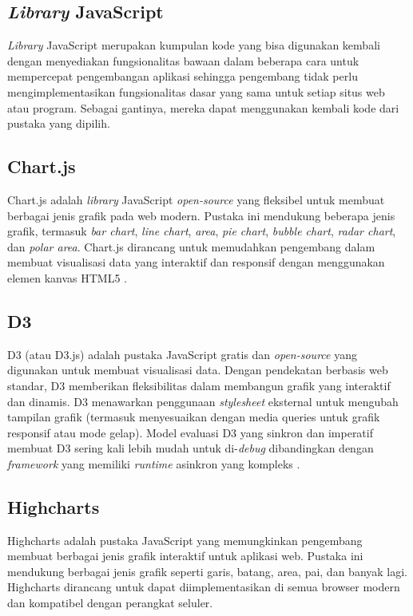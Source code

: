\subsection{\textit{Library} JavaScript}
\textit{Library} JavaScript merupakan kumpulan kode yang bisa digunakan kembali dengan menyediakan fungsionalitas bawaan dalam beberapa cara untuk mempercepat pengembangan aplikasi sehingga pengembang tidak perlu mengimplementasikan fungsionalitas dasar yang sama untuk setiap situs web atau program. Sebagai gantinya, mereka dapat menggunakan kembali kode dari pustaka yang dipilih.

\subsection{Chart.js}
Chart.js adalah \textit{library} JavaScript \textit{open-source} yang fleksibel untuk membuat berbagai jenis grafik pada web modern. Pustaka ini mendukung beberapa jenis grafik, termasuk \textit{bar chart}, \textit{line chart}, \textit{area}, \textit{pie chart}, \textit{bubble chart}, \textit{radar chart}, dan \textit{polar area}. Chart.js dirancang untuk memudahkan pengembang dalam membuat visualisasi data yang interaktif dan responsif dengan menggunakan elemen kanvas HTML5 \cite{ChartJs}.

\subsection{D3}
D3 (atau D3.js) adalah pustaka JavaScript gratis dan \textit{open-source} yang digunakan untuk membuat visualisasi data. Dengan pendekatan berbasis web standar, D3 memberikan fleksibilitas dalam membangun grafik yang interaktif dan dinamis.  D3 menawarkan penggunaan \textit{stylesheet} eksternal untuk mengubah tampilan grafik (termasuk menyesuaikan dengan media queries untuk grafik responsif atau mode gelap). Model evaluasi D3 yang sinkron dan imperatif membuat D3 sering kali lebih mudah untuk di-\textit{debug} dibandingkan dengan \textit{framework} yang memiliki \textit{runtime} asinkron yang kompleks \cite{D3}.

\subsection{Highcharts}
Highcharts adalah pustaka JavaScript yang memungkinkan pengembang membuat berbagai jenis grafik interaktif untuk aplikasi web. Pustaka ini mendukung berbagai jenis grafik seperti garis, batang, area, pai, dan banyak lagi. Highcharts dirancang untuk dapat diimplementasikan di semua browser modern dan kompatibel dengan perangkat seluler\cite{Highcharts}.

